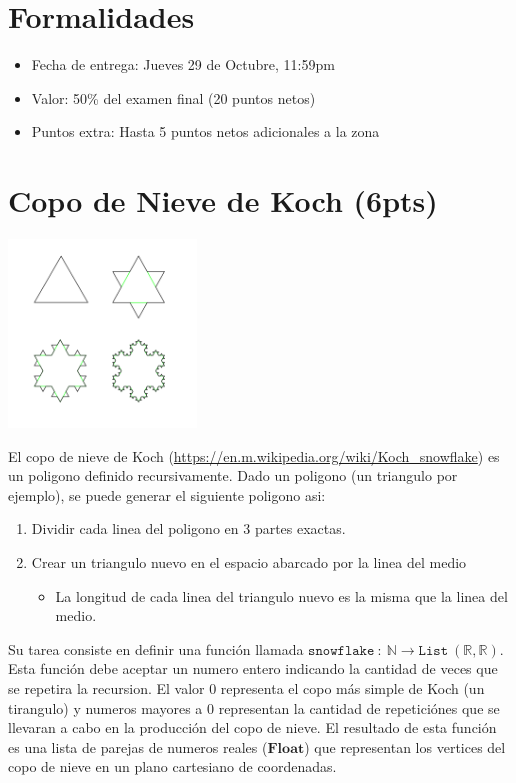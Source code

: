 \documentclass{article}
\begin{document}
\section*{Formalidades}

\begin{itemize}
    \item{Fecha de entrega: Jueves 29 de Octubre, 11:59pm}
    \item{Valor: 50\% del examen final (20 puntos netos)}
    \item{Puntos extra: Hasta 5 puntos netos adicionales a la zona}
\end{itemize}

\section*{Copo de Nieve de Koch (6pts)}
\begin{center}
    \includegraphics[width=5cm]{include/koch.png}
\end{center}
El copo de nieve de Koch (\url{https://en.m.wikipedia.org/wiki/Koch_snowflake}) es un poligono definido recursivamente.
Dado un poligono (un triangulo por ejemplo), se puede generar el
siguiente poligono asi:
\begin{enumerate}
        \item{Dividir cada linea del poligono en 3 partes exactas.}
        \item{Crear un triangulo nuevo en el espacio abarcado por la linea del medio
        \begin{itemize}
                \item{La longitud de cada linea del triangulo nuevo es la misma que la
                linea del medio.}
        \end{itemize}
        }
\end{enumerate}
Su tarea consiste en definir una funci\'on llamada $\mathtt{snowflake}\ :\ \mathbb{N}\rightarrow
\mathtt{List}\ (\mathbb{R},\mathbb{R})$. Esta funci\'on debe aceptar un numero entero indicando
la cantidad de veces que se repetira la recursion. El valor 0 representa el copo m\'as simple
de Koch (un tirangulo) y numeros mayores a 0 representan la cantidad de repetici\'ones que se
llevaran a cabo en la producci\'on del copo de nieve. El resultado de esta funci\'on es una
lista de parejas de numeros reales ($\mathbf{Float}$) que representan los vertices del copo
de nieve en un plano cartesiano de coordenadas.
\end{document}
